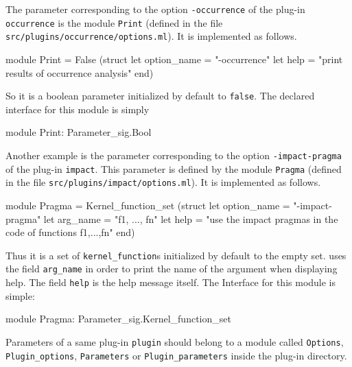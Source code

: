 \begin{example}
  The parameter corresponding to the option \texttt{-occurrence} of the plug-in
  \texttt{occurrence} is the module \texttt{Print} (defined in the file
  \texttt{src/plugins/occurrence/options.ml}). It is implemented as follows.
\begin{ocamlcode}
module Print =
  False
    (struct
       let option_name = "-occurrence"
       let help = "print results of occurrence analysis"
     end)
\end{ocamlcode}
So it is a boolean parameter initialized by default to
\texttt{false}. The declared interface for this module is simply
\begin{ocamlcode}
module Print: Parameter_sig.Bool
\end{ocamlcode}

Another example is the parameter corresponding to the option
\texttt{-impact-pragma} of the plug-in \texttt{impact}. This parameter is
defined by the module \texttt{Pragma} (defined in the file
\texttt{src/plugins/impact/options.ml}). It is implemented as follows.
\begin{ocamlcode}
module Pragma =
  Kernel_function_set
    (struct
       let option_name = "-impact-pragma"
       let arg_name = "f1, ..., fn"
       let help = "use the impact pragmas in the code of functions f1,...,fn"
     end)
\end{ocamlcode}
Thus it is a set of \texttt{kernel\_function}s initialized by default to
the empty set. \framac uses
the field \texttt{arg\_name} in order to print the name of the argument when
displaying help. The field \texttt{help} is the help message itself. The
Interface for this module is simple:
\begin{ocamlcode}
module Pragma: Parameter_sig.Kernel_function_set
\end{ocamlcode}
\end{example}

\begin{convention}
Parameters of a same plug-in \texttt{plugin} should belong to a module called
\texttt{Options}, \texttt{Plugin\_options}, \texttt{Parameters} or
\texttt{Plugin\_parameters} inside the plug-in directory.
\end{convention}

